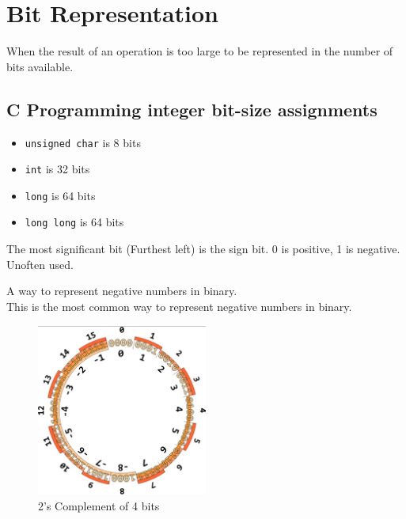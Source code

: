 \section{Bit Representation}
\begin{definition}
    [Overflow]
    When the result of an operation is too large to be represented in the number of bits available.
\end{definition}

\subsection*{C Programming integer bit-size assignments}
\begin{itemize}
    \item \texttt{unsigned char} is 8 bits
    \item \texttt{int} is 32 bits
    \item \texttt{long} is 64 bits
    \item \texttt{long long} is 64 bits
\end{itemize}

\begin{definition}
    The most significant bit (Furthest left) is the sign bit. 0 is positive, 1 is negative. \\
    Unoften used.
\end{definition}

\begin{definition}
    [2's Complement]
    A way to represent negative numbers in binary. \\
    This is the most common way to represent negative numbers in binary.
\end{definition}

\begin{figure}[h]
    \includegraphics[width=0.5\textwidth]{./LECTURE_1/TwosComplement.png}
    \centering
    \caption[short]{2's Complement of 4 bits}
\end{figure}
